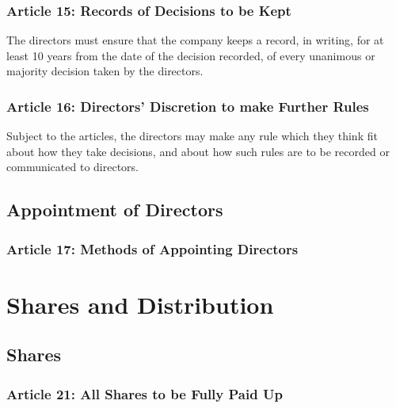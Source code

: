 \documentclass[letterpaper,10pt,english]{sphinxmanual}
\begin{document}
\subsection{Article 15: Records of Decisions to be Kept}
\label{\detokenize{directors:article-15-records-of-decisions-to-be-kept}}\label{\detokenize{directors:article-15}}
The directors must ensure that the company keeps a record, in writing, for at least 10 years from the date of the decision recorded, of every unanimous or majority decision taken by the directors.


\subsection{Article 16: Directors’ Discretion to make Further Rules}
\label{\detokenize{directors:article-16-directors-discretion-to-make-further-rules}}\label{\detokenize{directors:article-16}}
Subject to the articles, the directors may make any rule which they think fit about how they take decisions, and about how such rules are to be recorded or communicated to directors.


\section{Appointment of Directors}
\label{\detokenize{directors:appointment-of-directors}}

\subsection{Article 17: Methods of Appointing Directors}
\label{\detokenize{directors:article-17-methods-of-appointing-directors}}\label{\detokenize{directors:article-17}}

\chapter{Shares and Distribution}
\label{\detokenize{shares:shares-and-distribution}}\label{\detokenize{shares::doc}}

\section{Shares}
\label{\detokenize{shares:shares}}

\subsection{Article 21: All Shares to be Fully Paid Up}
\label{\detokenize{shares:article-21-all-shares-to-be-fully-paid-up}}
\end{document}
